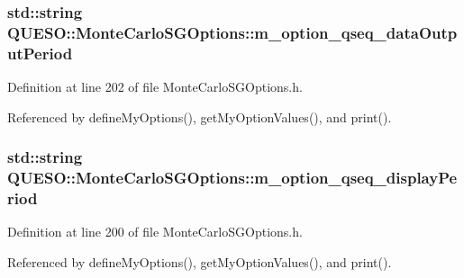 \hypertarget{class_q_u_e_s_o_1_1_monte_carlo_s_g_options_a604e3546503d8b7f9a8e0c48922b2ed7}{
\subsubsection[{m\-\_\-option\-\_\-qseq\-\_\-data\-Output\-Period}]{\setlength{\rightskip}{0pt plus 5cm}std\-::string Q\-U\-E\-S\-O\-::\-Monte\-Carlo\-S\-G\-Options\-::m\-\_\-option\-\_\-qseq\-\_\-data\-Output\-Period\hspace{0.3cm}{\ttfamily [private]}}}\label{class_q_u_e_s_o_1_1_monte_carlo_s_g_options_a604e3546503d8b7f9a8e0c48922b2ed7}


Definition at line 202 of file Monte\-Carlo\-S\-G\-Options.\-h.



Referenced by define\-My\-Options(), get\-My\-Option\-Values(), and print().

\hypertarget{class_q_u_e_s_o_1_1_monte_carlo_s_g_options_a14d5adea03855e45e535cf10cf8ea3ae}{
\subsubsection[{m\-\_\-option\-\_\-qseq\-\_\-display\-Period}]{\setlength{\rightskip}{0pt plus 5cm}std\-::string Q\-U\-E\-S\-O\-::\-Monte\-Carlo\-S\-G\-Options\-::m\-\_\-option\-\_\-qseq\-\_\-display\-Period\hspace{0.3cm}{\ttfamily [private]}}}\label{class_q_u_e_s_o_1_1_monte_carlo_s_g_options_a14d5adea03855e45e535cf10cf8ea3ae}


Definition at line 200 of file Monte\-Carlo\-S\-G\-Options.\-h.



Referenced by define\-My\-Options(), get\-My\-Option\-Values(), and print().

